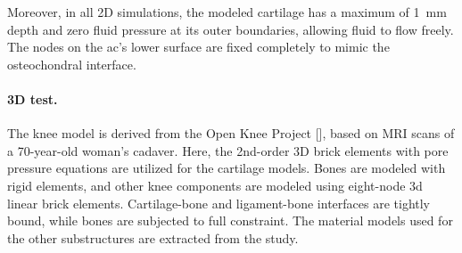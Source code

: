 Moreover, in all 2D simulations, the modeled cartilage has a maximum of 1~mm depth and zero fluid pressure at its outer boundaries, allowing fluid to flow freely. The nodes on the \ac{ac}'s lower surface are fixed completely to mimic the osteochondral interface.

\paragraph{3D test.} The knee model is derived from the Open Knee Project [\cite{erdemir2016}], based on MRI scans of a 70-year-old woman's cadaver. Here, the 2nd-order 3D brick elements with pore pressure equations are utilized for the cartilage models. Bones are modeled with rigid elements, and other knee components are modeled using eight-node \ac{3d} linear brick elements. Cartilage-bone and ligament-bone interfaces are tightly bound, while bones are subjected to full constraint. The material models used for the other substructures are extracted from the \cite{shim2016} study.


